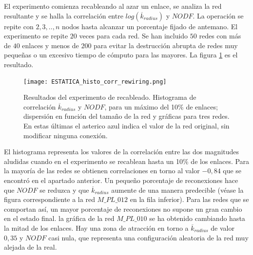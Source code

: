 El experimento comienza recableando al azar un enlace, se analiza la red resultante y se halla la correlación entre $log(\overline {k}_{radius})$  y $NODF$. La operación se repite con $2,3,..,n$ nodos hasta alcanzar un porcentaje fijado de antemano. El experimento se repite $20$ veces para cada red. Se han incluido $50$  redes con más de $40$ enlaces y menos de $200$ para evitar la destrucción abrupta de redes muy pequeñas o un excesivo tiempo de cómputo para las mayores. La figura \ref{fig:ESTATICA_histo_corr_rewiring} es el resultado.

\begin{figure}[h!]
\centering
\texttt{[image: ESTATICA\_histo\_corr\_rewiring.png]}
\caption {Resultados del experimento de recableado. Histograma de correlación $\overline {k}_{radius}$ y $NODF$, para un máximo del 10\% de enlaces; dispersión en función del tamaño de la red y gráficas para tres redes. En estas últimas el asterico azul indica el valor de la red original, sin modificar ninguna conexión.}
\label{fig:ESTATICA_histo_corr_rewiring}
\end{figure}

El histograma representa los valores de la correlación entre las dos magnitudes aludidas cuando en el experimento se recablean hasta un 10\% de los enlaces. Para la mayoría de las redes se obtienen correlaciones en torno al valor $-0,84$ que se encontró en el apartado anterior. Un pequeño porcentaje de reconexiones hace que $NODF$ se reduzca y que $\overline {k}_{radius}$ aumente de una manera predecible (véase la figura correspondiente a la red $M\_PL\_012$ en la fila inferior). Para las redes que se comportan así, un mayor porcentaje de reconexiones no supone un gran cambio en el estado final. la gráfica de la red $M\_PL\_010$ se ha obtenido cambiando hasta la mitad de los enlaces. Hay una zona de atracción en torno a $\overline {k}_{radius}$ de valor $0,35$ y $NODF$ casi nula, que representa una configuración aleatoria de la red muy alejada de la real.

